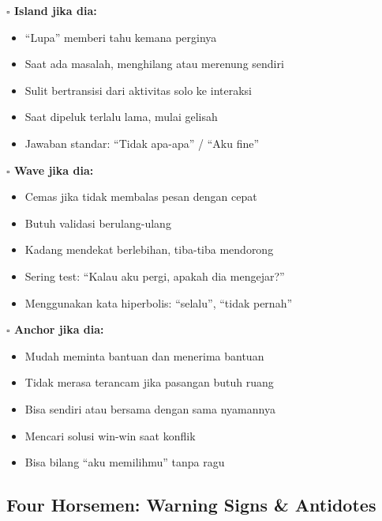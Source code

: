 \begin{tipbox}
\textbf{$\square$ Island jika dia:}
\begin{itemize}[itemsep=0.1cm]
    \item ``Lupa'' memberi tahu kemana perginya
    \item Saat ada masalah, menghilang atau merenung sendiri
    \item Sulit bertransisi dari aktivitas solo ke interaksi
    \item Saat dipeluk terlalu lama, mulai gelisah
    \item Jawaban standar: ``Tidak apa-apa'' / ``Aku fine''
\end{itemize}

\textbf{$\square$ Wave jika dia:}
\begin{itemize}[itemsep=0.1cm]
    \item Cemas jika tidak membalas pesan dengan cepat
    \item Butuh validasi berulang-ulang
    \item Kadang mendekat berlebihan, tiba-tiba mendorong
    \item Sering test: ``Kalau aku pergi, apakah dia mengejar?''
    \item Menggunakan kata hiperbolis: ``selalu'', ``tidak pernah''
\end{itemize}

\textbf{$\square$ Anchor jika dia:}
\begin{itemize}[itemsep=0.1cm]
    \item Mudah meminta bantuan dan menerima bantuan
    \item Tidak merasa terancam jika pasangan butuh ruang
    \item Bisa sendiri atau bersama dengan sama nyamannya
    \item Mencari solusi win-win saat konflik
    \item Bisa bilang ``aku memilihmu'' tanpa ragu
\end{itemize}
\end{tipbox}

\subsection{Four Horsemen: Warning Signs \& Antidotes}

